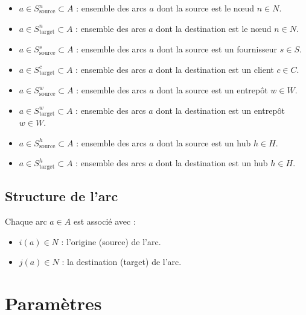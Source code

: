 \documentclass{article}
\begin{document}
\begin{itemize}
    \item $a \in S_{\text{source}}^n \subset A$ : ensemble des arcs $a$ dont la source est le nœud $n \in N$.
    \item $a \in S_{\text{target}}^n \subset A$ : ensemble des arcs $a$ dont la destination est le nœud $n \in N$.
    \item $a \in S_{\text{source}}^s \subset A$ : ensemble des arcs $a$ dont la source est un fournisseur $s \in S$.
    \item $a \in S_{\text{target}}^c \subset A$ : ensemble des arcs $a$ dont la destination est un client $c \in C$.
    \item $a \in S_{\text{source}}^w \subset A$ : ensemble des arcs $a$ dont la source est un entrepôt $w \in W$.
    \item $a \in S_{\text{target}}^w \subset A$ : ensemble des arcs $a$ dont la destination est un entrepôt $w \in W$.
    \item $a \in S_{\text{source}}^h \subset A$ : ensemble des arcs $a$ dont la source est un hub $h \in H$.
    \item $a \in S_{\text{target}}^h \subset A$ : ensemble des arcs $a$ dont la destination est un hub $h \in H$.
\end{itemize}

\subsection{Structure de l'arc}

Chaque arc $a \in A$ est associé avec :
\begin{itemize}
    \item $i(a) \in N$ : l'origine (source) de l'arc.
    \item $j(a) \in N$ : la destination (target) de l'arc.
\end{itemize}

\section{Paramètres}
\end{document}
